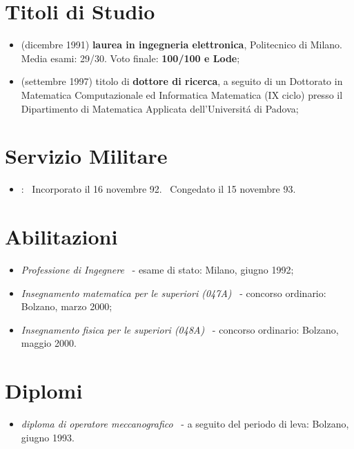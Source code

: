 \documentclass[11pt]{article}
\begin{document}
\section{Titoli di Studio}

\begin{itemize}
\item[] (dicembre 1991) {\bf laurea in ingegneria elettronica},
      Politecnico di Milano. Media esami: 29/30. Voto finale: {\bf 100/100 e Lode};
\item[] (settembre 1997) titolo di {\bf dottore di ricerca},
         a seguito di un Dottorato in
         Matematica Computazionale ed Informatica Matematica (IX ciclo)
         presso il Dipartimento di Matematica Applicata
         dell'Universit\'a di Padova;
\end{itemize}


\section{Servizio Militare}
\begin{itemize}
   \item[] \hspace{-8.0mm}{\bf Assolto}: \ Incorporato il 16 novembre 92.
                          \ Congedato il 15 novembre 93.
\end{itemize}


\section{Abilitazioni}
\begin{itemize}
\vspace{-1.0mm}
   \item[]
      {\em Professione di Ingegnere} \ 
       - esame di stato: Milano, giugno 1992;
                    
\vspace{-1.0mm}
   \item[]
      {\em Insegnamento matematica per le superiori (047A)} \ 
       - concorso ordinario: Bolzano, marzo 2000;

\vspace{-1.0mm}
   \item[]
      {\em Insegnamento fisica per le superiori (048A)} \ 
       - concorso ordinario: Bolzano, maggio 2000.
\end{itemize}

\section{Diplomi}
\begin{itemize}
\vspace{-1.0mm}
   \item[]
      {\em diploma di operatore meccanografico} \ 
       - a seguito del periodo di leva: Bolzano, giugno 1993.
\end{itemize}
\end{document}
